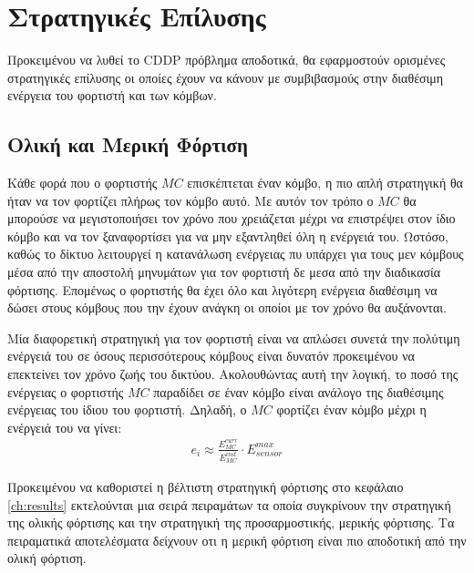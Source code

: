 \section{Στρατηγικές Επίλυσης}
Προκειμένου να λυθεί το CDDP πρόβλημα αποδοτικά, θα εφαρμοστούν ορισμένες στρατηγικές επίλυσης οι οποίες έχουν να κάνουν με συμβιβασμούς στην διαθέσιμη ενέργεια του
φορτιστή και των κόμβων.

\subsection{Ολική και Μερική Φόρτιση}
Κάθε φορά που ο φορτιστής $MC$ επισκέπτεται έναν κόμβο, η πιο απλή στρατηγική θα ήταν να τον φορτίζει πλήρως τον κόμβο αυτό. Με αυτόν τον τρόπο ο $MC$ θα μπορούσε να
μεγιστοποιήσει τον χρόνο που χρειάζεται μέχρι να επιστρέψει στον ίδιο κόμβο και να τον ξαναφορτίσει για να μην εξαντληθεί όλη η ενέργειά του. Ωστόσο, καθώς το δίκτυο
λειτουργεί η κατανάλωση ενέργειας πυ υπάρχει για τους μεν κόμβους μέσα από την αποστολή μηνυμάτων για τον φορτιστή δε μεσα από την διαδικασία φόρτισης. Επομένως ο
φορτιστής θα έχει όλο και λιγότερη ενέργεια διαθέσιμη να δώσει στους κόμβους που την έχουν ανάγκη οι οποίοι με τον χρόνο θα αυξάνονται.

Μία διαφορετική στρατηγική για τον φορτιστή είναι να απλώσει συνετά την πολύτιμη ενέργειά του σε όσους περισσότερους κόμβους είναι δυνατόν προκειμένου να επεκτείνει
τον χρόνο ζωής του δικτύου. Ακολουθώντας αυτή την λογική, το ποσό της ενέργειας ο φορτιστής $MC$ παραδίδει σε έναν κόμβο είναι ανάλογο της διαθέσιμης ενέργειας του
ίδιου του φορτιστή. Δηλαδή, ο $MC$ φορτίζει έναν κόμβο μέχρι η ενέργειά του να γίνει:
\begin{align*}
e_{i} \approx \frac{E^{curr}_{MC}}{E^{init}_{MC}}\cdot E^{max}_{sensor}
\end{align*}

Προκειμένου να καθοριστεί η βέλτιστη στρατηγική φόρτισης στο κεφάλαιο \ref{ch:results} εκτελούνται μια σειρά πειραμάτων τα οποία συγκρίνουν την στρατηγική της ολικής
φόρτισης και την στρατηγική της προσαρμοστικής, μερικής φόρτισης. Τα πειραματικά αποτελέσματα δείχνουν οτι η μερική φόρτιση είναι πιο αποδοτική από την ολική φόρτιση.

